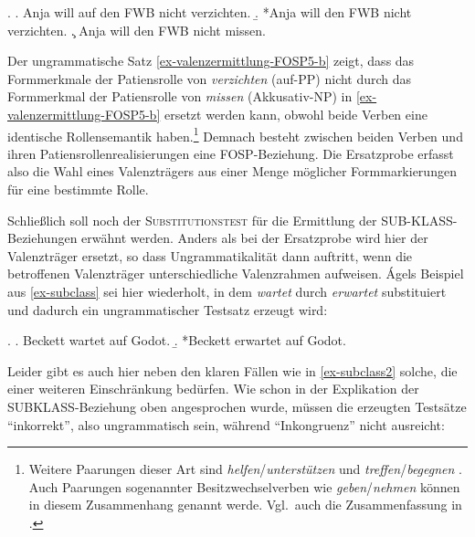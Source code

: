 \ex. \label{ex-valenzermittlung-FOSP5}
\a. Anja will auf den FWB nicht verzichten.\label{ex-valenzermittlung-FOSP5-a}
\b. *Anja will den FWB nicht verzichten.\label{ex-valenzermittlung-FOSP5-b}
\c. Anja will den FWB nicht missen.\label{ex-valenzermittlung-FOSP5-c}

Der ungrammatische Satz \ref{ex-valenzermittlung-FOSP5-b} zeigt, dass das Formmerkmale der Patiensrolle von {\it verzichten} (auf-PP) nicht durch das Formmerkmal der Patiensrolle von {\it missen} (Akkusativ-NP) in \ref{ex-valenzermittlung-FOSP5-b}  ersetzt werden kann, obwohl beide Verben eine identische Rollensemantik haben.\footnote{Weitere Paarungen dieser Art sind {\it helfen}/{\it unterstützen} \citep[402]{Mueller:10} und {\it treffen}/{\it begegnen} \citep[126]{Pollard:Sag:87}. Auch Paarungen sogenannter Besitzwechselverben wie {\it geben}/{\it nehmen} \citep[Kapitel~7]{Kunze:91} können in diesem Zusammenhang genannt werde. Vgl.\ auch die Zusammenfassung in \citet[Abschnitt~11.11.5]{Mueller:10}.} Demnach besteht zwischen beiden Verben und ihren Patiensrollenrealisierungen eine FOSP-Beziehung. Die Ersatzprobe erfasst also die Wahl eines Valenzträgers aus einer Menge möglicher Formmarkierungen für eine bestimmte Rolle.
\largerpage%



\label{par-subsitutionstest} Schlie\ss lich soll noch der \textsc{Substitutionstest} für die Ermittlung der SUB-\linebreak KLASS-Beziehun\-gen erwähnt werden. Anders als bei der Ersatzprobe wird hier der Valenzträger ersetzt, so dass Ungrammatikalität dann auftritt, wenn die betroffenen Valenzträger unterschiedliche Valenzrahmen aufweisen. \'Agels Beispiel aus \ref{ex-subclass} sei hier wiederholt, in dem {\it wartet} durch {\it erwartet} substituiert und dadurch ein ungrammatischer Testsatz erzeugt wird: 

\ex. \label{ex-subclass2}
\a. Beckett wartet auf Godot.
\b. *Beckett erwartet auf Godot.

Leider gibt es auch hier neben den klaren Fällen wie in \ref{ex-subclass2} solche, die einer weiteren Einschränkung bedürfen. Wie schon in der Explikation der SUBKLASS-Beziehung oben angesprochen wurde, müssen die erzeugten Testsätze "`inkorrekt"', also ungrammatisch sein, während "`Inkongruenz"' nicht ausreicht:

